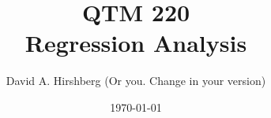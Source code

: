 \usepackage{amsmath, mathtools,array,multirow}
\usepackage{listings}

\usepackage{graphicx,xcolor,colortbl}


\usepackage{natbib}


\makeatletter
\def\c@slideinframe{\beamer@slideinframe}
\makeatother


\newcommand{\model}{\mathcal{M}}
\newcommand{\R}{\mathbb{R}}
\newcommand{\V}{\mathcal{V}}
\newcommand{\undersetlight}[2]{\underset{\textcolor{lightgray}{#1}}{#2}}
\newcommand{\undersetlighttext}[2]{\underset{\textcolor{lightgray}{\text{#1}}{#2}}}
\newcommand{\light}[1]{\textcolor{lightgray}{#1}}
\newcommand{\undersetgray}[2]{\underset{\textcolor{gray}{#1}}{#2}}

\let\P\relax
\DeclareMathOperator{\P}{P}
\DeclareMathOperator{\Q}{Q}
\DeclareMathOperator{\Pn}{P_n}
\DeclareMathOperator{\E}{E}
\DeclareMathOperator{\Cov}{Cov}
\DeclareMathOperator{\Cor}{Cor}
\DeclareMathOperator{\Var}{Var}
\DeclareMathOperator{\trace}{trace}
\DeclareMathOperator{\rank}{rank}
\DeclareMathOperator{\width}{w}
\DeclareMathOperator{\radius}{rad}
\DeclareMathOperator{\nlaplacian}{-\Delta}
\DeclareMathOperator*{\argmin}{argmin}
\DeclareMathOperator*{\argmax}{argmax}
\DeclarePairedDelimiter{\abs}{\lvert}{\rvert}
\DeclarePairedDelimiter{\norm}{\lVert}{\rVert}
\DeclarePairedDelimiter{\cb}{\{}{\}}
\DeclarePairedDelimiter{\sqb}{[}{]}
\DeclarePairedDelimiter{\p}{(}{)}
\DeclarePairedDelimiter{\inner}{\langle}{\rangle}


\title{QTM 220 \\ Regression Analysis}
\date{\today}
\author{David A. Hirshberg (Or you. Change in your version)}

